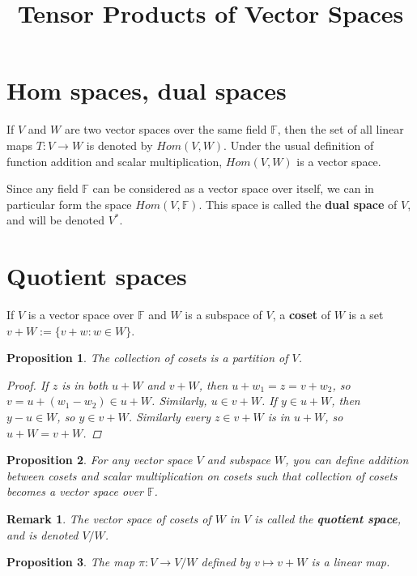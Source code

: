 \documentclass[a4paper,14pt]{article}
\title{Tensor Products of Vector Spaces}
\newtheorem*{prop}{Proposition}
\newtheorem*{remark}{Remark}
\begin{document}
\maketitle
\section{Hom spaces, dual spaces}
If $V$ and $W$ are two vector spaces over the same field $\mathbb{F}$, then the set of all linear maps $T: V \to W$ is denoted by $Hom(V, W)$. Under the usual definition of function addition and scalar multiplication, $Hom(V, W)$ is a vector space.

Since any field $\mathbb{F}$ can be considered as a vector space over itself, we can in particular form the space $Hom(V, \mathbb{F})$. This space is called the \textbf{dual space} of $V$, and will be denoted $V^{\ast}$.

\section{Quotient spaces}
If $V$ is a vector space over $\mathbb{F}$ and $W$ is a subspace of $V$, a \textbf{coset} of $W$ is a set $v + W := \{v + w : w \in W\}$. 

\begin{prop}
The collection of cosets is a partition of $V$.
\begin{proof}
If $z$ is in both $u + W$ and $v + W$, then $u + w_1 = z = v + w_2$, so $v = u + (w_1 - w_2) \in u + W$. Similarly, $u \in v + W$. If $y \in u + W$, then $y - u \in W$, so $y \in v + W$. Similarly every $z \in v + W$ is in $u + W$, so $u + W = v + W$.
\end{proof}
\end{prop}

\begin{prop}
For any vector space $V$ and subspace $W$, you can define addition between cosets and scalar multiplication on cosets such that collection of cosets becomes a vector space over $\mathbb{F}$.
\end{prop}

\begin{remark}
The vector space of cosets of $W$ in $V$ is called the \textbf{quotient space}, and is denoted $V/W$.
\end{remark}

\begin{prop}
The map $\pi: V \to V/W$ defined by $v \mapsto v + W$ is a linear map.
\end{prop}
\end{document}
